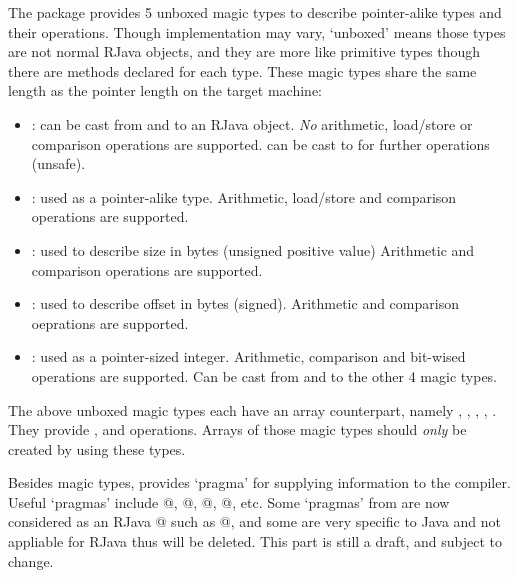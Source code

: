 \documentclass[12pt]{article}
\begin{document}
The  package provides 5 unboxed magic types
to describe pointer-alike types and their operations. Though implementation
may vary, `unboxed' means those types are not normal RJava objects,
and they are more like primitive types though there are methods declared 
for each type. 
These magic types share the same length as the pointer length on the target machine:

\begin{itemize}
\item
{}: can be cast from and to an RJava object. 
\emph{No} arithmetic, load/store or comparison operations are supported. 
 can be cast to  for 
further operations (unsafe). 

\item
{}: used as a pointer-alike type. 
Arithmetic, load/store and comparison operations are supported. 

\item
{}: used to describe size in bytes (unsigned positive value)
Arithmetic and comparison operations are supported. 

\item
{}: used to describe offset in bytes (signed). 
Arithmetic and comparison oeprations are supported. 

\item
{}: used as a pointer-sized integer. 
Arithmetic, comparison and bit-wised operations are supported. 
Can be cast from and to the other 4 magic types. 
\end{itemize}

\noindent
The above unboxed magic types each have an array counterpart, namely
, , 
, ,
. 
They provide , 
 and  operations. 
Arrays of those magic types should \emph{only} be created by using these types.

Besides magic types,  provides `pragma'
for supplying information to the compiler. Useful 
`pragmas' include @, @, 
@, @, etc. Some `pragmas' 
from  are now considered as an 
RJava @ such as @, 
and some are very specific to Java 
and not appliable for RJava thus will be deleted. This part is still a draft, and
subject to change. 
\end{document}
